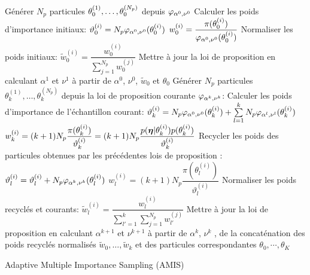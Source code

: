 \begin{algorithm}[p!]
	\begin{algorithmic}
	
	
	
	\State Générer $N_p$ particules ${\theta}_0^{(1)}, \dots, {\theta}_0^{(N_p)}$ depuis  ${\varphi}_{\alpha^0, \nu^0}$
		\State Calculer les poids d'importance initiaux:
		\State $\vartheta_0^{(i)} = N_p {\varphi}_{\alpha^0, \nu^0}({\theta}_0^{(i)})$
		\State $w_0^{(i)} = \dfrac{\pi(\theta_0^{(i)})}{{\varphi}_{\alpha^0, \nu^0}(\theta_0^{(i)})}$
	\EndFor
	\State Normaliser les poids initiaux:
		\State $\tilde{w}_0^{(i)} = \dfrac{w_0^{(i)}}{\sum\limits_{j=1}^{N_p}w_0^{(j)}}$
	\EndFor
	\State Mettre à jour la loi de proposition en calculant $\alpha^1$ et $\nu^1$ à partir de $\alpha^0$, $\nu^0$, $\tilde{w}_0$ {et $\theta_0$}
		\State Générer $N_p$ particules $\theta_k^{(1)}, \dots, \theta_k^{(N_p)}$ depuis la loi de proposition courante ${\varphi}_{\alpha^k, \nu^k}$:
			\State Calculer les poids d'importance de l'échantillon courant:
			\State $\vartheta_k^{(i)} = N_p {\varphi}_{\alpha^0, \nu^0}(\theta_k^{(i)}) + \sum\limits_{l=1}^k N_p {\varphi}_{\alpha^l, \nu^l}(\theta_k^{(i)})$
			\State $w_k^{(i)} = (k+1)N_p \dfrac{\pi(\theta_k^{(i)})}{\vartheta_k^{(i)}} = (k+1)N_p \dfrac{p({\bm{\eta}} | \theta_k^{(i)})p(\theta_k^{(i)})}{\vartheta_k^{(i)}}$
			\EndFor
		\State Recycler les poids des particules obtenues par les précédentes lois de proposition :
				\State $\vartheta_l^{(i)} = \vartheta_l^{(i)} + N_p {\varphi}_{\alpha^k, \nu^k}(\theta_l^{(i)})$
				\State $w_l^{(i)} = (k+1) N_p \dfrac{\pi(\theta_l^{(i)})}{\vartheta_l^{(i)}}$
				\EndFor
			\EndFor
		\State Normaliser les poids recyclés et courants:
				\State $\tilde{w}_l^{(i)} = \dfrac{w_l^{(i)}}{\sum\limits_{l'=1}^k\sum\limits_{j=1}^{N_p} w_{l'}^{(j)}}$
				\EndFor
			\EndFor
		\State Mettre à jour la loi de proposition en calculant $\alpha^{k+1}$ et $\nu^{k+1}$ à partir de $\alpha^k$, $\nu^k$ , de la concaténation des poids recyclés normalisés $\tilde{w}_0, \dots, \tilde{w}_k$ {et des particules correspondantes $\theta_0, \cdots, \theta_K$}
		\EndFor
	
	\end{algorithmic}
	\caption{Adaptive Multiple Importance Sampling (AMIS)}
	\label{algo_AMIS}
\end{algorithm}

